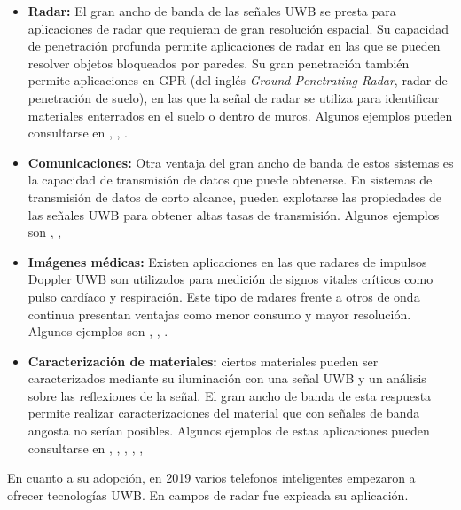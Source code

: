 \begin{itemize}
  \item \textbf{Radar:} El gran ancho de banda de las señales UWB se presta
        para aplicaciones de radar que requieran de gran resolución espacial. Su
        capacidad de penetración profunda permite aplicaciones de radar en las
        que se pueden resolver objetos bloqueados por paredes. Su gran
        penetración también permite aplicaciones en GPR (del inglés
        \textit{Ground Penetrating Radar}, radar de penetración de suelo), en
        las que la señal de radar se utiliza para identificar materiales
        enterrados en el suelo o dentro de muros. Algunos ejemplos
        pueden consultarse en \cite{morales2018}, \cite{savelyev2010},
        \cite{senapati2021}.
  \item \textbf{Comunicaciones:} Otra ventaja del gran ancho de banda de estos
        sistemas es la capacidad de transmisión de datos que puede obtenerse.  En
        sistemas de transmisión de datos de corto alcance, pueden explotarse las
        propiedades de las señales UWB para obtener altas tasas de transmisión.
        Algunos ejemplos son \cite{jaesang2004}, \cite{zhiquan2005},
        \cite{Heydari2005}
  \item \textbf{Imágenes médicas:} Existen aplicaciones en las que radares de
        impulsos Doppler UWB son utilizados para medición de signos vitales
        críticos como pulso cardíaco y respiración. Este tipo de radares frente
        a otros de onda continua presentan ventajas como menor consumo y mayor
        resolución. Algunos ejemplos son \cite{jalivand2011}, \cite{oloumi2020},
        \cite{jalivand2011_2}.
  \item \textbf{Caracterización de materiales:} ciertos materiales pueden ser
      caracterizados mediante su iluminación con una señal UWB y un análisis
        sobre las reflexiones de la señal. El gran ancho de banda de esta
        respuesta permite realizar caracterizaciones del material que con
        señales de banda angosta no serían posibles. Algunos ejemplos de estas
        aplicaciones pueden consultarse en \cite{altieri2017},
        \cite{Salman2008}, \cite{Bouza2023}, \cite{Muqaibel2003},
        \cite{salman2010performance}, \cite{Altieri2021}
\end{itemize}

En cuanto a su adopción, en 2019 varios telefonos inteligentes empezaron a
ofrecer tecnologías UWB. En campos de radar fue expicada su aplicación.

